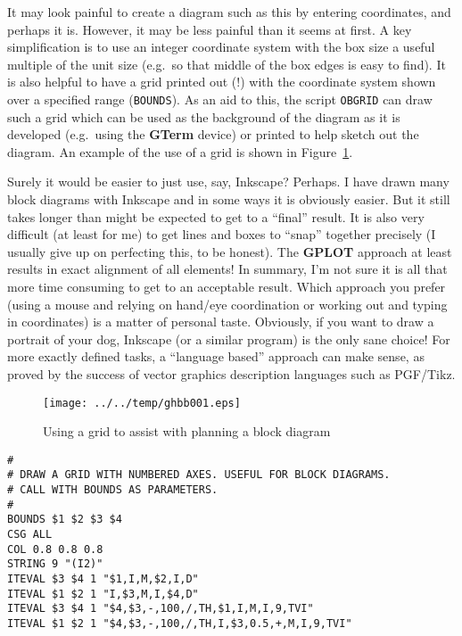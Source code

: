 \documentclass[a4paper,twoside,11pt]{article}
\makeatletter
\def\maxwidth{%
  \ifdim\Gin@nat@width>\linewidth
    \linewidth
  \else
    \Gin@nat@width
  \fi
}
\newcommand{\newpara}{\par\vspace{4mm}\noindent}
\makeatother
\begin{document}
\newpara
It may look painful to create a diagram such as this by entering
coordinates, and perhaps it is. However, it may be less painful than it
seems at first. A key simplification is to use an integer coordinate
system with the box size a useful multiple of the unit size (e.g.~so
that middle of the box edges is easy to find). It is also helpful to
have a grid printed out (!) with the coordinate system shown over a
specified range (\texttt{BOUNDS}). As an aid to this, the script
\texttt{OBGRID} can draw such a grid which can be used as the background
of the diagram as it is developed (e.g.~using the \textbf{GTerm} device)
or printed to help sketch out the diagram.
An example of the use of a grid is shown in Figure~\ref{fig:ghbb001}.

\newpara
Surely it would be easier to just use, say, Inkscape? Perhaps. I have
drawn many block diagrams with Inkscape and in some ways it is obviously
easier. But it still takes longer than might be expected to get to a
``final'' result. It is also very difficult (at least for me) to get
lines and boxes to ``snap'' together precisely (I usually give up on
perfecting this, to be honest). The \textbf{GPLOT} approach at least results in
exact alignment of all elements! In summary, I'm not sure it is all that
more time consuming to get to an acceptable result. Which approach you
prefer (using a mouse and relying on hand/eye coordination or working
out and typing in coordinates) is a matter of personal taste. Obviously,
if you want to draw a portrait of your dog, Inkscape (or a similar
program) is the only sane choice! For more exactly defined tasks, a
``language based'' approach can make sense, as proved by the success of
vector graphics description languages such as PGF/Tikz.

\begin{figure}
  \centering
  \texttt{[image: ../../temp/ghbb001.eps]}
  \caption{Using a grid to assist with planning a block diagram}
  \label{fig:ghbb001}
\end{figure}

\begin{lstlisting}
#
# DRAW A GRID WITH NUMBERED AXES. USEFUL FOR BLOCK DIAGRAMS.
# CALL WITH BOUNDS AS PARAMETERS.
#
BOUNDS $1 $2 $3 $4
CSG ALL
COL 0.8 0.8 0.8
STRING 9 "(I2)"
ITEVAL $3 $4 1 "$1,I,M,$2,I,D"
ITEVAL $1 $2 1 "I,$3,M,I,$4,D"
ITEVAL $3 $4 1 "$4,$3,-,100,/,TH,$1,I,M,I,9,TVI"
ITEVAL $1 $2 1 "$4,$3,-,100,/,TH,I,$3,0.5,+,M,I,9,TVI"
\end{lstlisting}
\end{document}
